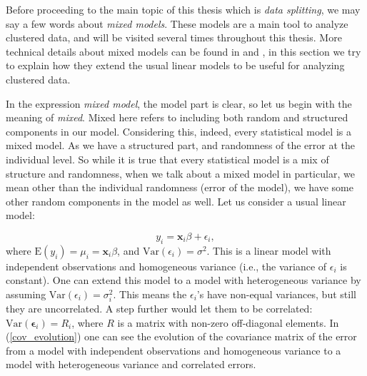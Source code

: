 \documentclass[11pt,a5paper,twoside]{book}
\begin{document}
Before proceeding to the main topic of this thesis which is \emph{data splitting}, we may say a few words about \emph{mixed models}. These models are a main tool to analyze clustered data, and will be visited several times throughout this thesis. More technical details about mixed models can be found in \cite{Molenberghs2000} and \cite{molenberghs2005}, in this section we try to explain how they extend the usual linear models to be useful for analyzing clustered data. 

In the expression \emph{mixed model}, the model part is clear, so let us begin with the meaning of \emph{mixed}. Mixed here refers to including both random and structured components in our model. Considering this, indeed, every statistical model is a mixed model. As we have a structured part, and randomness of the error at the individual level. So while it is true that every statistical model is a mix of structure and randomness, when we talk about a mixed model in particular, we mean other than the individual randomness (error of the model), we have some other random components in the model as well. Let us consider a usual linear model: 

\begin{equation}
\label{lin_model}
y_i = \mathbf{x}_i\beta + \epsilon_i,
\end{equation}
where $\mathrm{E}(y_i) = \mu_i = \mathbf{x}_i \beta$, and $\mathrm{Var}(\epsilon_i) = \sigma^2$. This is a linear model with independent observations and homogeneous variance (i.e., the variance of $\epsilon_i$ is constant). One can extend this model to a model with heterogeneous variance by assuming $\mathrm{Var}(\epsilon_i) = \sigma^2_i$. This means the $\epsilon_i$'s have non-equal variances, but still they are uncorrelated. A step further would let them to be correlated: $\mathrm{Var}(\mathbf{\epsilon}_i) = R_i$, where $R$ is a matrix with non-zero off-diagonal elements. In (\ref{cov_evolution}) one can see the evolution of the covariance matrix of the error from a model with independent observations and homogeneous variance to a model with heterogeneous variance and correlated errors.
\end{document}
